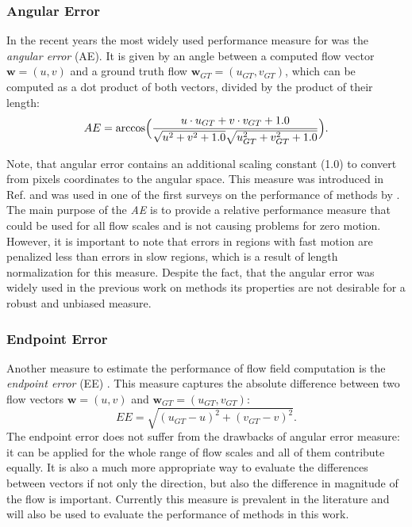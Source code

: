 \subsubsection{Angular Error}
\label{angular_error}

In the recent years the most widely used performance measure for \opticalflow was the \textit{angular error} (AE). It is given by an angle between a computed flow vector $ \textbf{w} = (u, v)$ and a ground truth flow $\textbf{w}_{GT} = (u_{GT}, v_{GT})$, which can be computed as a dot product of both vectors, divided by the product of their length: 
$$ AE = \text{arccos} \Bigl (\frac{u \cdot u_{GT} + v \cdot v_{GT} + 1.0} {\sqrt{u^2 + v^2 + 1.0} \sqrt{u_{GT}^2 + v_{GT}^2 + 1.0}   } \Bigr ). $$

Note, that angular error contains an additional scaling constant (1.0) to convert from
pixels coordinates to the angular space. This measure was introduced in Ref. \cite{Fleet90} and was used in one of the first surveys on the performance of \opticalflow methods by \cite{Barron94}. The main purpose of the \textit{AE} is to provide a relative performance measure that could be used for all flow scales and is not causing problems for zero motion. However, it is important to note that errors in regions with fast motion are penalized less than errors in slow regions, which is a result of length normalization for this measure. Despite the fact, that the angular error was widely used in the previous work on \opticalflow methods its properties are not desirable for a robust and unbiased measure.


\subsubsection{Endpoint Error}
\label{endpoint_error}

Another measure to estimate the performance of flow field computation is the \textit{endpoint error} (EE) \cite{Otte94}. This measure captures the absolute difference between two flow vectors $\textbf{w} = (u, v)$ and $\textbf{w}_{GT} = (u_{GT}, v_{GT})$:
$$ EE = \sqrt{(u_{GT} - u)^2 + (v_{GT} - v)^2}. $$
The endpoint error does not suffer from the drawbacks of angular error measure: it can be applied for the whole range of flow scales and all of them contribute equally. It is also a much more appropriate way to evaluate the differences between vectors if not only the direction, but also the difference in magnitude of the flow is important. Currently this measure is prevalent in the literature \cite{Sun10, Middl} and will also be used to evaluate the performance of \opticalflow methods in this work. 


